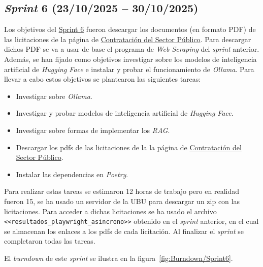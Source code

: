 \subsection{\textit{Sprint} 6 (23/10/2025 -- 30/10/2025)}

Los objetivos del \href{https://github.com/lbr1014/TFG_RAG/milestone/6?closed=1}{Sprint 6} fueron descargar los documentos (en formato PDF) de las licitaciones de la página de \href{https://contrataciondelestado.es/wps/portal/plataforma/inicio/!ut/p/z1/04_Sj9CPykssy0xPLMnMz0vMAfIjo8zinYItLBydDB0NDIxDLQwczQIDnS1dDIwMLI31wwkpiAJKG-AAjgZA_VFgJabGziZhXmEBZsGe7gYGnh5uLj6hhqYG7kZmUAV4zCjIjTDIdFRUBAD_nKPx/dz/d5/L2dBISEvZ0FBIS9nQSEh/}{Contratación del Sector Público}. Para descargar dichos PDF se va a usar de base el programa de \textit{Web Scraping} del \textit{sprint} anterior. Además, se han fijado como objetivos investigar sobre los modelos de inteligencia artificial de \textit{Hugging Face} e instalar y probar el funcionamiento de \textit{Ollama}.
Para llevar a cabo estos objetivos se plantearon las siguientes tareas:
\begin{itemize}
\tightlist
	\item Investigar sobre \textit{Ollama}.
	\item Investigar y probar modelos de inteligencia artificial de \textit{Hugging Face}.
	\item Investigar sobre formas de implementar los \textit{RAG}.
	\item Descargar los pdfs de las licitaciones de la la página de \href{https://contrataciondelestado.es/wps/portal/plataforma/inicio/!ut/p/z1/04_Sj9CPykssy0xPLMnMz0vMAfIjo8zinYItLBydDB0NDIxDLQwczQIDnS1dDIwMLI31wwkpiAJKG-AAjgZA_VFgJabGziZhXmEBZsGe7gYGnh5uLj6hhqYG7kZmUAV4zCjIjTDIdFRUBAD_nKPx/dz/d5/L2dBISEvZ0FBIS9nQSEh/}{Contratación del Sector Público}.
	\item Instalar las dependencias en \textit{Poetry}.
\end{itemize}

Para realizar estas tareas se estimaron 12 horas de trabajo pero en realidad fueron 15, se ha usado un servidor de la UBU para descargar un zip con las licitaciones. Para acceder a dichas licitaciones se ha usado el archivo \texttt{<<resultados\_playwright\_asincrono>>} obtenido en el \textit{sprint} anterior, en el cual se almacenan los enlaces a los pdfs de cada licitación. Al finalizar el \textit{sprint} se completaron todas las tareas.

El \textit{burndown} de este \textit{sprint} se ilustra en la figura~\ref{fig:Burndown/Sprint6}.

